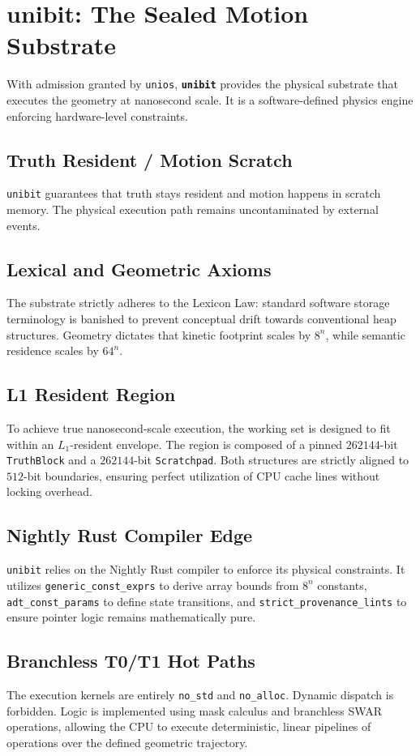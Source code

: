 \chapter{unibit: The Sealed Motion Substrate}

With admission granted by \texttt{unios}, \textbf{\texttt{unibit}} provides the physical substrate that executes the geometry at nanosecond scale. It is a software-defined physics engine enforcing hardware-level constraints.

\section{Truth Resident / Motion Scratch}

\texttt{unibit} guarantees that truth stays resident and motion happens in scratch memory. The physical execution path remains uncontaminated by external events.

\section{Lexical and Geometric Axioms}

The substrate strictly adheres to the Lexicon Law: standard software storage terminology is banished to prevent conceptual drift towards conventional heap structures. Geometry dictates that kinetic footprint scales by $8^n$, while semantic residence scales by $64^n$.

\section{L1 Resident Region}

To achieve true nanosecond-scale execution, the working set is designed to fit within an $L_1$-resident envelope. The region is composed of a pinned $262144$-bit \texttt{TruthBlock} and a $262144$-bit \texttt{Scratchpad}. Both structures are strictly aligned to $512$-bit boundaries, ensuring perfect utilization of CPU cache lines without locking overhead.

\section{Nightly Rust Compiler Edge}

\texttt{unibit} relies on the Nightly Rust compiler to enforce its physical constraints. It utilizes \texttt{generic\_const\_exprs} to derive array bounds from $8^n$ constants, \texttt{adt\_const\_params} to define state transitions, and \texttt{strict\_provenance\_lints} to ensure pointer logic remains mathematically pure.

\section{Branchless T0/T1 Hot Paths}

The execution kernels are entirely \texttt{no\_std} and \texttt{no\_alloc}. Dynamic dispatch is forbidden. Logic is implemented using mask calculus and branchless SWAR operations, allowing the CPU to execute deterministic, linear pipelines of operations over the defined geometric trajectory.